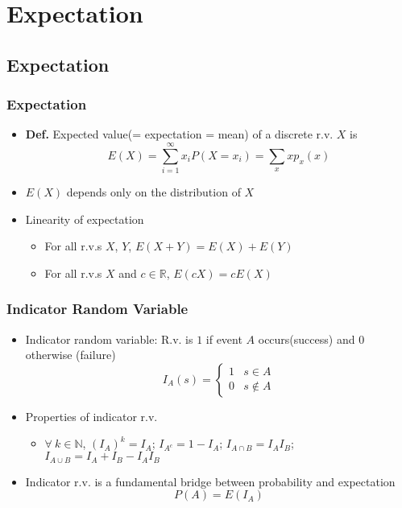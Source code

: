 \section{Expectation}

\subsection{Expectation}

\subsubsection*{Expectation}
\begin{itemize}
    \item \textbf{Def.} Expected value(= expectation = mean) of a discrete r.v. $X$ is
    \begin{equation}
        E(X)=\sum_{i=1}^\infty x_iP(X=x_i)=\sum_{x}xp_x(x)
    \end{equation}
    \item $E(X)$ depends only on the distribution of $X$
    \item Linearity of expectation
    \begin{itemize}
        \item For all r.v.s $X$, $Y$, $E(X+Y)=E(X)+E(Y)$
        \item For all r.v.s $X$ and $c\in\mathbb{R}$, $E(cX)=cE(X)$
    \end{itemize}
\end{itemize}

\subsubsection*{Indicator Random Variable}
\begin{itemize}
    \item Indicator random variable: R.v. is $1$ if event $A$ occurs(success) and $0$ otherwise (failure)
    \begin{equation}
        I_A(s)=\begin{cases}
            1 & s\in A\\
            0 & s\notin A
        \end{cases}
    \end{equation}
    \item Properties of indicator r.v.
    \begin{itemize}
        \item $\forall~k\in\mathbb{N}$, $(I_A)^k=I_A$; $I_{A^c}=1-I_A$; $I_{A\cap B}=I_AI_B$; $I_{A\cup B}=I_A+I_B-I_AI_B$
    \end{itemize}
    \item Indicator r.v. is a fundamental bridge between probability and expectation
    \begin{equation}
        P(A)=E(I_A)
    \end{equation}
\end{itemize}

